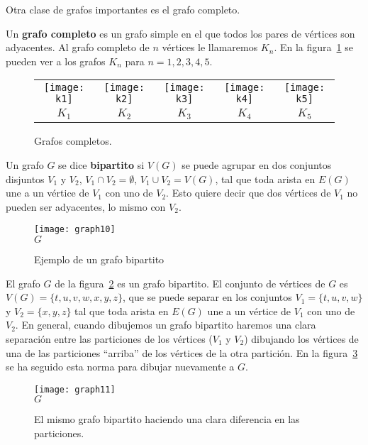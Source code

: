 Otra clase de grafos importantes es el grafo completo.

\begin{definicion}
Un {\bf grafo completo} es un grafo simple en el que todos los pares de vértices son adyacentes.
Al grafo completo de $n$ vértices le llamaremos $K_n$.
En la figura~\ref{fig:cliques} se pueden ver a los grafos $K_n$ para $n=1,2,3,4,5$.
\begin{figure}[h!]
\centering
\begin{tabular}{ccccc}
\texttt{[image: k1]}&\texttt{[image: k2]}&\texttt{[image: k3]}&\texttt{[image: k4]}&\texttt{[image: k5]}\\
$K_1$ & $K_2$ & $K_3$ & $K_4$ & $K_5$
\end{tabular}
\caption{Grafos completos.}
\label{fig:cliques}
\end{figure}
\end{definicion}

\begin{definicion}
Un grafo $G$ se dice {\bf bipartito} si $V(G)$ se puede agrupar en dos conjuntos disjuntos $V_1$ y $V_2$, $V_1\cap V_2=\emptyset$, $V_1\cup V_2=V(G)$, tal que toda arista en $E(G)$ une a un vértice de $V_1$ con uno de $V_2$.
Esto quiere decir que dos vértices de $V_1$ no pueden ser adyacentes, lo mismo con $V_2$.
\end{definicion}
\begin{figure}[h!]
\centering
\texttt{[image: graph10]}\\
$G$
\caption{Ejemplo de un grafo bipartito}
\label{fig:graph10}
\end{figure}

\begin{ejemplo}
El grafo $G$ de la figura~\ref{fig:graph10} es un grafo bipartito.
El conjunto de vértices de $G$ es $V(G)=\{t,u,v,w,x,y,z\}$, que se puede separar en los conjuntos $V_1=\{t,u,v,w\}$ y $V_2=\{x,y,z\}$ tal que toda arista en $E(G)$ une a un vértice de $V_1$ con uno de $V_2$.
En general, cuando dibujemos un grafo bipartito haremos una clara separación entre las particiones de los vértices ($V_1$ y $V_2$) dibujando los vértices de una de las particiones ``arriba'' de los vértices de la otra partición.
En la figura~\ref{fig:graph11} se ha seguido esta norma para dibujar nuevamente a $G$.
\begin{figure}[h!]
\centering
\texttt{[image: graph11]}\\
$G$
\caption{El mismo grafo bipartito haciendo una clara diferencia en las particiones.}
\label{fig:graph11}
\end{figure}  
\end{ejemplo}

